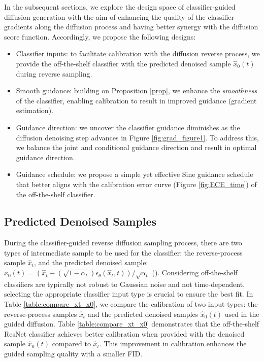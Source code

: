 \documentclass{article}
\theoremstyle{definition}
\begin{document}
In the subsequent sections, we explore the design space of classifier-guided diffusion generation with the aim of enhancing the quality of the classifier gradients along the diffusion process and having better synergy with the diffusion score function. Accordingly, we propose the following designs:

\begin{itemize}
\item Classifier inputs: to facilitate calibration with the diffusion reverse process, we provide the off-the-shelf classifier with the predicted denoised sample $\hat{x}_0(t)$ during reverse sampling. 
\item Smooth guidance: building on Proposition \ref{prop}, we enhance the \textit{smoothness} of the classifier, enabling calibration to result in improved guidance (gradient estimation). 
\item Guidance direction: we uncover the classifier guidance diminishes as the diffusion denoising step advances in Figure \ref{fig:grad_figure1}. To address this, we balance the joint and conditional guidance direction and result in optimal guidance direction. 
\item Guidance schedule: we propose a simple yet effective Sine guidance schedule that better aligns with the calibration error curve (Figure \ref{fig:ECE_time}) of the off-the-shelf classifier.
\end{itemize}

\subsection{Predicted Denoised Samples}
During the classifier-guided reverse diffusion sampling process, there are two types of intermediate sample to be used for the classifier: the reverse-process sample $\hat{x}_{t}$, and the predicted denoised sample: $\hat{x}_0(t) = (\hat{x}_t - (\sqrt{1-\alpha_t})\epsilon_{\theta}(\hat{x}_t,t)) / \sqrt{\alpha_t}$ (\cite{song2020denoising, bansal2023universal}). 
Considering off-the-shelf classifiers are typically not robust to Gaussian noise and not time-dependent, 
selecting the appropriate classifier input type is crucial to ensure the best fit. In Table \ref{table:compare_xt_x0}, we compare the calibration of two input types: the reverse-process samples $\hat{x}_t$ and the predicted denoised samples $\hat{x}_0(t)$ used in the guided diffusion. 
Table \ref{table:compare_xt_x0} demonstrates that the off-the-shelf ResNet classifier achieves better calibration when provided with the denoised sample $\hat{x}_0(t)$ compared to $\hat{x}_t$. This improvement in calibration enhances the guided sampling quality with a smaller FID. 
\end{document}
